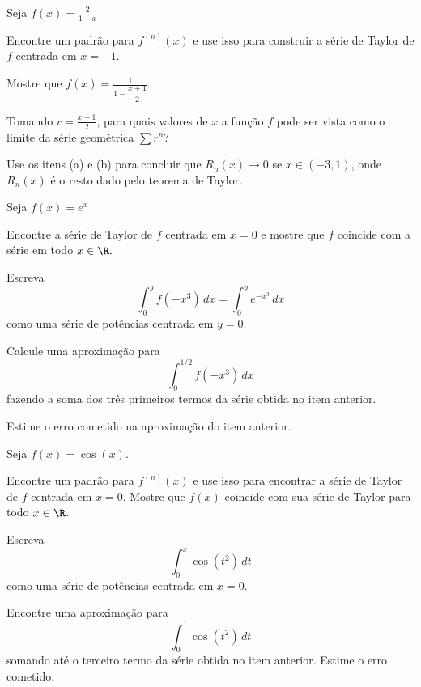 \begin{exercises*}
\begin{exercise}
  Seja \(f(x)=\frac{2}{1-x}\)
  \begin{alphalist}
    \item Encontre um padrão para $f^{(n)}(x)$ e use isso para construir
    a série de Taylor de $f$ centrada em $x=-1$.
    \item Mostre que
    \(f(x)=\frac{1}{1-\dfrac{x+1}{2}}\)
    \item
    Tomando \(r=\frac{x+1}{2}\), para quais valores de $x$
    a função $f$ pode ser vista como o limite da série geométrica \(\sum r^n\)?
    \item Use os itens (a) e (b) para concluir que $R_n(x)\rightarrow 0$
    se $x\in(-3, 1)$, onde $R_n(x)$ é o resto dado pelo teorema de Taylor.
  \end{alphalist}
\end{exercise}

\begin{exercise}
  Seja \(f(x)=e^{x}\)
  \begin{alphalist}
    \item Encontre a série de Taylor de $f$ centrada em $x=0$
    e mostre que $f$ coincide com a série em todo $x\in\R.$
    \item Escreva
    \[ \int_0^y f(-x^3)\,dx = \int_0^y e^{-x^3}\,dx \]
    como uma série de potências centrada em $y=0$.
    \item Calcule uma aproximação para
    \[ \int_0^{1/2} f(-x^3)\,dx \]
    fazendo a soma dos três primeiros termos da série obtida no item anterior.
    \item Estime o erro cometido na aproximação do item anterior.
  \end{alphalist}
\end{exercise}

\begin{exercise}
  Seja \( f(x)=\cos(x) \).
  \begin{alphalist}
    \item Encontre um padrão para $f^{(n)}(x)$ e use isso para encontrar a série de Taylor
    de $f$ centrada em $x=0$.
    Mostre que $f(x)$ coincide com sua série de Taylor para todo $x\in\R$.
    \item Escreva
    \[\int_0^x \cos(t^2)\,dt\]
    como uma série de potências centrada em $x=0$.
    \item Encontre uma aproximação para
    \[\int_0^1\cos(t^2)\,dt\]
    somando até o terceiro termo da série obtida no item anterior.
    Estime o erro cometido.
  \end{alphalist}
\end{exercise}


\end{exercises*}
